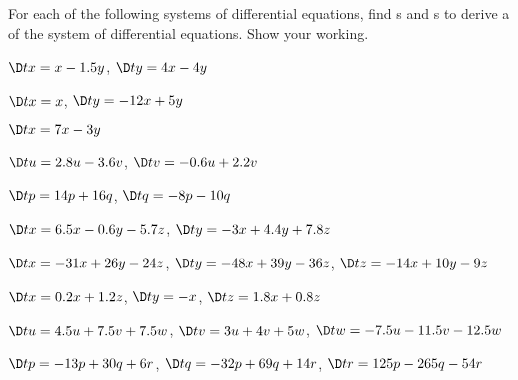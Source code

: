 \begin{exercise}  
For each of the following systems of differential equations, find s and s to derive a  of the system of differential equations.  Show your working.

\begin{Parts}
\item \(\D tx=x-1.5y\), \(\D ty=4x-4y\)

\item \(\D tx=x\), \(\D ty=-12x+5y\)

\item \(\D tx=7x-3y\)

\begin{OmitV1}
\item \(\D tu=2.8u-3.6v\), \(\D tv=-0.6u+2.2v\)

\item \(\D tp=14p+16q\), \(\D tq=-8p-10q\)

\item \(\D tx=6.5x-0.6y-5.7z\), \(\D ty=-3x+4.4y+7.8z\)%

\item \(\D tx=-31x+26y-24z\), \(\D ty=-48x+39y-36z\), \(\D tz=-14x+10y-9z\)
\end{OmitV1}

\item \(\D tx=0.2x+1.2z\), \(\D ty=-x\), \(\D tz=1.8x+0.8z\)

\item \(\D tu=4.5u+7.5v+7.5w\), \(\D tv=3u+4v+5w\), \(\D tw=-7.5u-11.5v-12.5w\)

\item \(\D tp=-13p+30q+6r\), \(\D tq=-32p+69q+14r\), \(\D tr=125p-265q-54r\)

\end{Parts}
\end{exercise}





